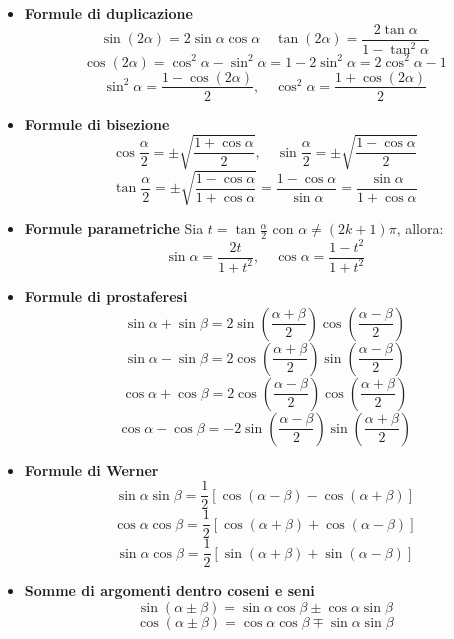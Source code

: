 \documentclass{book}
\newcommand{\g}{\textbf}
\newcommand{\e}{\begin{equation}}
\newcommand{\ex}{\end{equation} }
\renewcommand{\it}{\item[$\cdot$]}
\begin{document}
\begin{multicols}{4}
\begin{itemize}
    \it \g{Formule di duplicazione}
        \e{\sin(2\alpha) = 2\sin\alpha\cos\alpha \quad \tan(2\alpha) = \frac{2\tan\alpha}{1 - \tan^2\alpha}} \ex
        \e{\cos(2\alpha) = \cos^2\alpha - \sin^2\alpha = 1 - 2\sin^2\alpha = 2\cos^2\alpha - 1} \ex
        \e{\sin^2\alpha = \frac{1 - \cos(2\alpha)}{2}, \quad \cos^2\alpha = \frac{1 + \cos(2\alpha)}{2}} \ex

    \it \g{Formule di bisezione}
        \e{\cos\frac{\alpha}{2} = \pm\sqrt{\frac{1 + \cos\alpha}{2}}, \quad \sin\frac{\alpha}{2} = \pm\sqrt{\frac{1 - \cos\alpha}{2}}} \ex
        \e{\tan\frac{\alpha}{2} = \pm\sqrt{\frac{1 - \cos\alpha}{1 + \cos\alpha}} = \frac{1-\cos\alpha}{\sin\alpha}=\frac{\sin\alpha}{1+\cos\alpha}} \ex

    \it \g{Formule parametriche}
        Sia $t = \tan\frac{\alpha}{2}$ con $\alpha \neq (2k + 1)\pi$, allora:
        \e{\sin\alpha = \frac{2t}{1 + t^2}, \quad \cos\alpha = \frac{1 - t^2}{1 + t^2}} \ex

    \it \g{Formule di prostaferesi}
        \e{\sin\alpha + \sin\beta = 2\sin\left(\frac{\alpha + \beta}{2}\right)\cos\left(\frac{\alpha - \beta}{2}\right)} \ex
        \e{\sin\alpha - \sin\beta = 2\cos\left(\frac{\alpha + \beta}{2}\right)\sin\left(\frac{\alpha - \beta}{2}\right)} \ex
        \e{\cos\alpha + \cos\beta = 2\cos\left(\frac{\alpha - \beta}{2}\right)\cos\left(\frac{\alpha + \beta}{2}\right)} \ex
        \e{\cos\alpha - \cos\beta = -2\sin\left(\frac{\alpha - \beta}{2}\right)\sin\left(\frac{\alpha + \beta}{2}\right)} \ex

    \it \g{Formule di Werner}
        \e{\sin\alpha\sin\beta = \frac{1}{2}[\cos(\alpha - \beta) - \cos(\alpha + \beta)]} \ex
        \e{\cos\alpha\cos\beta = \frac{1}{2}[\cos(\alpha + \beta) + \cos(\alpha - \beta)]} \ex
        \e{\sin\alpha\cos\beta = \frac{1}{2}[\sin(\alpha + \beta) + \sin(\alpha - \beta)]} \ex
    \it \g{Somme di argomenti dentro coseni e seni}
     \e{\sin(\alpha\pm\beta)=\sin\alpha\cos\beta\pm\cos\alpha\sin\beta}\ex
        \e{\cos(\alpha\pm\beta)=\cos\alpha\cos\beta\mp\sin\alpha\sin\beta}\ex
        

\end{itemize}
\end{multicols}
\end{document}
